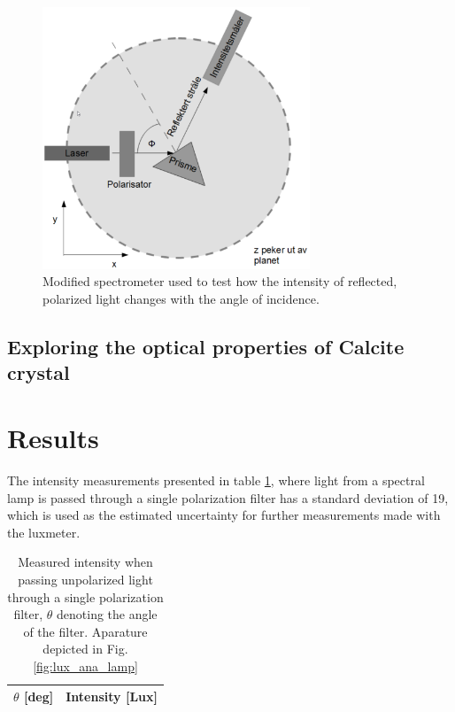 \documentclass[11pt,a4paper]{article}
\begin{document}
    \begin{figure}[H]
      \center
      \includegraphics[width=8cm]{scripts/figs/modified_spectrometer.png}
      \caption{Modified spectrometer used to test how the intensity of reflected, polarized light changes with the angle of incidence.}
      \label{fig:mod_spectro}
    \end{figure}

  \subsection{Exploring the optical properties of Calcite crystal}


\section{\label{sect:results}Results}
  
  The intensity measurements presented in table \ref{tab:ana}, where light from a spectral lamp is passed through a single polarization filter has a standard deviation of 19, which is used as the estimated uncertainty for further measurements made with the luxmeter.


  \begin{table}[H]
      \center
      \caption{Measured intensity when passing unpolarized light through a single polarization filter, $\theta$ denoting the angle of the filter. Aparature depicted in Fig. \ref{fig:lux_ana_lamp}}
       \begin{tabular}{r | l}
        $\theta$ [deg] & Intensity [Lux] \\ \hline
         
       \end{tabular}
       \label{tab:ana}
  \end{table}
\end{document}
